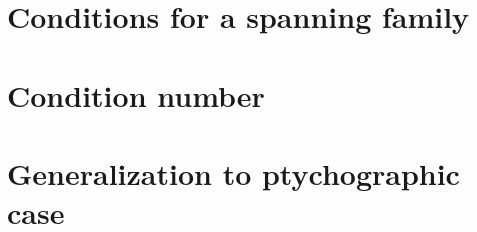 \section{Conditions for a spanning family}

\section{Condition number}

\label{sec:con_number}
\section{Generalization to ptychographic case}

\label{sec:con_number_ptych}
